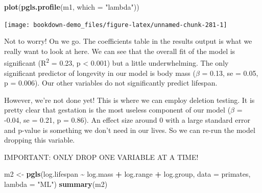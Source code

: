 \documentclass[
]{book}
\newenvironment{Shaded}{\begin{snugshade}}{\end{snugshade}}
\newcommand{\DataTypeTok}[1]{\textcolor[rgb]{0.13,0.29,0.53}{#1}}
\newcommand{\KeywordTok}[1]{\textcolor[rgb]{0.13,0.29,0.53}{\textbf{#1}}}
\newcommand{\NormalTok}[1]{#1}
\newcommand{\OperatorTok}[1]{\textcolor[rgb]{0.81,0.36,0.00}{\textbf{#1}}}
\newcommand{\StringTok}[1]{\textcolor[rgb]{0.31,0.60,0.02}{#1}}
\begin{document}
\begin{Shaded}
\begin{Highlighting}[]
\KeywordTok{plot}\NormalTok{(}\KeywordTok{pgls.profile}\NormalTok{(m1, }\DataTypeTok{which =} \StringTok{"lambda"}\NormalTok{))}
\end{Highlighting}
\end{Shaded}

\begin{center}\texttt{[image: bookdown-demo\_files/figure-latex/unnamed-chunk-281-1]} \end{center}

Not to worry! On we go. The coefficients table in the results output is what we really want to look at here. We can see that the overall fit of the model is significant (R\textsuperscript{2} = 0.23, p \textless{} 0.001) but a little underwhelming. The only significant predictor of longevity in our model is body mass (\(\beta\) = 0.13, se = 0.05, p = 0.006). Our other variables do not significantly predict lifespan.

However, we're not done yet! This is where we can employ deletion testing. It is pretty clear that gestation is the most useless component of our model (\(\beta\) = -0.04, se = 0.21, p = 0.86). An effect size around 0 with a large standard error and p-value is something we don't need in our lives. So we can re-run the model dropping this variable.

IMPORTANT: ONLY DROP ONE VARIABLE AT A TIME!

\begin{Shaded}
\begin{Highlighting}[]
\NormalTok{m2 \textless{}{-}}\StringTok{ }\KeywordTok{pgls}\NormalTok{(log.lifespan }\OperatorTok{\textasciitilde{}}\StringTok{ }\NormalTok{log.mass }\OperatorTok{+}\StringTok{ }\NormalTok{log.range }\OperatorTok{+}\StringTok{ }\NormalTok{log.group,}
           \DataTypeTok{data =}\NormalTok{ primates, }\DataTypeTok{lambda =} \StringTok{"ML"}\NormalTok{)}
\KeywordTok{summary}\NormalTok{(m2)}
\end{Highlighting}
\end{Shaded}
\end{document}

